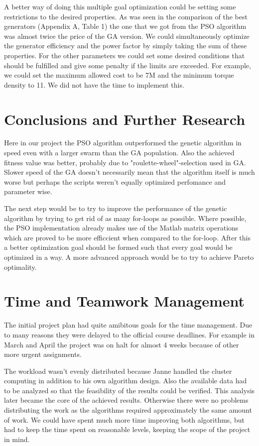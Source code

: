 \documentclass[twoside]{article}
\begin{document}
\begin{multicols}{2}
A better way of doing this multiple goal optimization could be setting some restrictions to the desired properties. As was seen in the comparison of the best generators (Appendix A, Table 1) the one that we got from the PSO algorithm was almost twice the price of the GA version. We could simultaneously optimize the generator efficiency and the power factor by simply taking the sum of these properties. For the other parameters we could set some desired conditions that should be fulfilled and give some penalty if the limits are exceeded. For example, we could set the maximum allowed cost to be 7M and the minimum torque density to 11. We did not have the time to implement this.



\section{Conclusions and Further Research}

Here in our project the PSO algorithm outperformed the genetic algorithm in speed even with a larger swarm than the GA population. Also the achieved fitness value was better, probably due to "roulette-wheel"-selection used in GA. Slower speed of the GA doesn't necessarily mean that the algorithm itself is much worse but perhaps the scripts weren't equally optimized perfomance and parameter wise.

The next step would be to try to improve the performance of the genetic algorithm by trying to get rid of as many for-loops as possible. Where possible, the PSO implementation already makes use of the Matlab matrix operations which are proved to be more efficcient when compared to the for-loop. After this a better optimization goal should be formed such that every goal would be optimized in a way. A more advanced approach would be to try to achieve Pareto optimality.

\section{Time and Teamwork Management}
The initial project plan had quite amibitous goals for the time management. Due to many reasons they were delayed to the official course deadlines. For example in March and April the project was on halt for almost 4 weeks because of other more urgent assignments.

The workload wasn't evenly distributed because Janne handled the cluster computing in addition to his own algorithm design. Also the available data had to be analyzed so that the feasibility of the results could be verified. This analysis later became the core of the achieved results. Otherwise there were no problems distributing the work as the algorithms required approximately the same amount of work. We could have spent much more time improving both algorithms, but had to keep the time spent on reasonable levels, keeping the scope of the project in mind.


\end{multicols}
\end{document}

